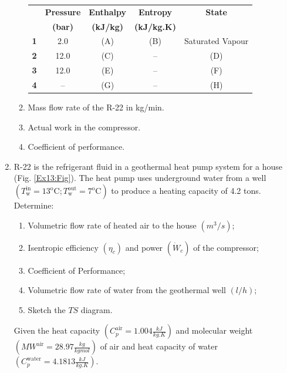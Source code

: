 \documentclass[12pts,a4paper,amsmath,amssymb,floatfix]{article}%
\begin{document}
\begin{enumerate}[label=\bfseries Problem \arabic*]
\begin{enumerate}
\begin{center}
\begin{tabular}{ || c || c | c | c | c || }
\hline\hline
        & {\bf Pressure}  &  {\bf Enthalpy}  & {\bf Entropy}     & {\bf State}  \\
        & {\bf (bar)}     &  {\bf (kJ/kg)}   &  {\bf (kJ/kg.K)}  &              \\
\hline\hline
{\bf 1} &   2.0           &       (A)        &      (B)          &  Saturated Vapour \\
{\bf 2} &   12.0          &       (C)        &      --           &  (D)          \\
{\bf 3} &   12.0          &       (E)        &      --           &  (F)        \\
{\bf 4} &   --            &       (G)        &      --           &  (H)       \\ 
\hline\hline
\end{tabular}
\end{center}

\item Mass flow rate of the R-22 in kg/min.
\item Actual work in the compressor.
\item Coefficient of performance.

\end{enumerate}


\item \label{Ex13} R-22 is the refrigerant fluid in a geothermal heat pump system for a house (Fig. \ref{Ex13:Fig}). The heat pump uses underground water from a well $\left(T_{\text{w}}^{\text{in}}=13^{\text{o}}\text{C}; T_{\text{w}}^{\text{out}}=7^{\text{o}}\text{C}\right)$ to produce a heating capacity of 4.2 tons. Determine:
\begin{enumerate}
 \item Volumetric flow rate of heated air to the house $\left(m^{3}/s\right)$;
 \item Isentropic efficiency $\left(\eta_{c}\right)$ and power $\left(\dot{W}_{c}\right)$ of the compressor;
 \item Coefficient of Performance;
 \item Volumetric flow rate of water from the geothermal well $\left(l/h\right)$;
 \item Sketch the $TS$ diagram.
\end{enumerate}
Given the heat capacity $\left(C_{p}^{\text{air}}=1.004\displaystyle\frac{kJ}{kg.K}\right)$ and molecular weight $\left(MW^{\text{air}}=28.97\displaystyle\frac{kg}{kgmol}\right)$ of air and heat capacity of water $\left(C_{p}^{\text{water}}=4.1813\displaystyle\frac{kJ}{kg.K}\right)$.


\end{enumerate}
\end{document}
